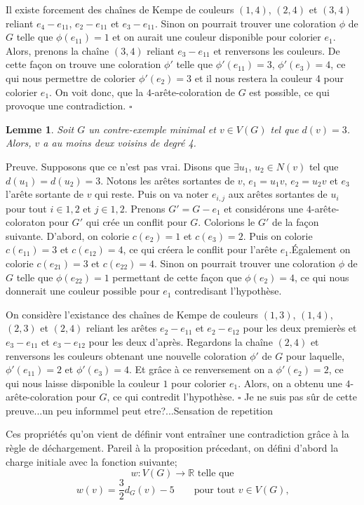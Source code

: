 \documentclass[10pt,a4paper]{article}
\newtheorem{lemme}{Lemme}
\newcommand{\ep}{{\hfill $\square$}}
\begin{document}
Il existe forcement des chaînes de Kempe de couleurs $(1,4)$, $(2,4)$ et $(3,4)$ reliant $e_4-e_{11}$, $e_2-e_{11}$ et $e_3-e_{11}$. Sinon on pourrait trouver une coloration $\phi$ de $G$ telle que $\phi(e_{11}) = 1$ et on aurait une couleur disponible pour colorier $e_1$. Alors, prenons la chaîne $(3,4)$ reliant $e_3-e_{11}$ et renversons les couleurs. De cette façon on trouve une coloration $\phi'$ telle que $\phi'(e_{11})=3$, $\phi'(e_3) = 4$, ce qui nous permettre de colorier $\phi'(e_2) = 3$ et il nous restera la couleur 4 pour colorier $e_1$. On voit donc, que la $4$-arête-coloration de $G$ est possible, ce qui provoque une contradiction.
\ep

\begin{lemme}
Soit $G$ un contre-exemple minimal et $v \in V(G)$ tel que $d(v)=3$. Alors, $v$ a au moins deux voisins de degré 4.
\end{lemme}

Preuve.
Supposons que ce n'est pas vrai. Disons que $\exists u_1$, $u_2 \in N(v)$ tel que $d(u_1) = d(u_2) = 3$. Notons les arêtes sortantes de $v$, $e_1 = u_1v$, $e_2 = u_2v$ et $e_3$ l'arête sortante de $v$ qui reste. Puis on va noter $e_{i,j}$ aux arêtes sortantes de $u_i$ pour tout $i \in {1,2}$ et $j \in {1,2}$. Prenons $G' = G - e_1$ et considérons une $4$-arête-coloraton pour $G'$ qui crée un conflit pour $G$. Colorions le $G'$ de la façon suivante. D'abord, on colorie $c(e_2)=1$ et $c(e_3)=2$. Puis on colorie $c(e_{11})=3$ et $c(e_{12})=4$, ce qui créera le conflit pour l'arête $e_1$.Également on colorie $c(e_{21})=3$ et $c(e_{22})=4$. Sinon on pourrait trouver une coloration $\phi$ de $G$ telle que $\phi(e_{22})=1$ permettant de cette façon que $\phi(e_2)=4$, ce qui nous donnerait une couleur possible pour $e_1$ contredisant l'hypothèse.

On considère l'existance des chaînes de Kempe de couleurs $(1,3)$, $(1,4)$, $(2,3)$ et $(2,4)$ reliant les arêtes $e_2-e_{11}$ et $e_2-e_{12}$ pour les deux premierès et $e_3-e_{11}$ et $e_3-e_{12}$ pour les deux d'après. Regardons la chaîne $(2,4)$ et renversons les couleurs obtenant une nouvelle coloration $\phi'$ de $G$ pour laquelle, $\phi'(e_{11})=2$ et $\phi'(e_{3})=4$. Et grâce à ce renversement on a $\phi'(e_{2})=2$, ce qui nous laisse disponible la couleur $1$ pour colorier $e_1$. Alors, on a obtenu une $4$-arête-coloration pour $G$, ce qui contredit l'hypothèse. 
\ep
{\color{red} Je ne suis pas sûr de cette preuve...un peu informmel peut etre?...Sensation de repetition}

\bigskip
Ces propriétés qu'on vient de définir vont entraîner une contradiction grâce à la règle de déchargement. Pareil à la proposition précedant, on défini d'abord la charge initiale avec la fonction suivante;
$$w: V(G) \to \mathbb{R} \textrm{ telle que} $$
 $$w(v) = \frac{3}{2} d_G(v) - 5 \qquad \textrm{pour tout $v\in V(G)$,}$$
\end{document}
